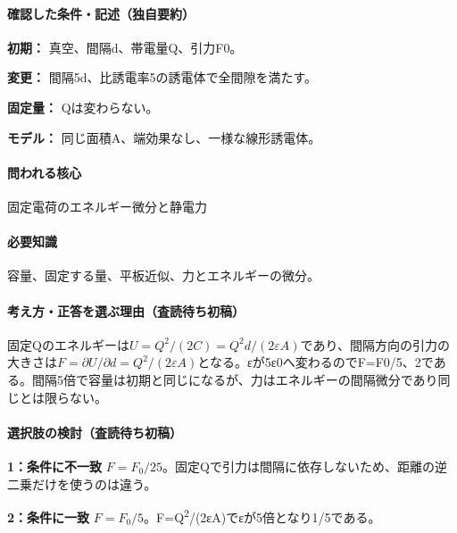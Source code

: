 \paragraph{確認した条件・記述（独自要約）}\mbox{}\par

\noindent\textbf{初期：} 真空、間隔d、帯電量Q、引力F0。\par

\noindent\textbf{変更：} 間隔5d、比誘電率5の誘電体で全間隙を満たす。\par

\noindent\textbf{固定量：} Qは変わらない。\par

\noindent\textbf{モデル：} 同じ面積A、端効果なし、一様な線形誘電体。\par

\paragraph{問われる核心} 固定電荷のエネルギー微分と静電力

\paragraph{必要知識} 容量、固定する量、平板近似、力とエネルギーの微分。

\paragraph{考え方・正答を選ぶ理由（査読待ち初稿）} 固定Qのエネルギーは\(U=Q^2/(2C)=Q^2d/(2\varepsilon A)\)であり、間隔方向の引力の大きさは\(F=\partial U/\partial d=Q^2/(2\varepsilon A)\)となる。εが5ε0へ変わるのでF=\allowbreak{}F0/5、2である。間隔5倍で容量は初期と同じになるが、力はエネルギーの間隔微分であり同じとは限らない。

\paragraph{選択肢の検討（査読待ち初稿）}\mbox{}\par

\noindent\textbf{1：条件に不一致} \(F=F_0/25\)。固定Qで引力は間隔に依存しないため、距離の逆二乗だけを使うのは違う。\par

\noindent\textbf{2：条件に一致} \(F=F_0/5\)。F=\allowbreak{}Q\textsuperscript{2}/(2εA)でεが5倍となり1/5である。\par

